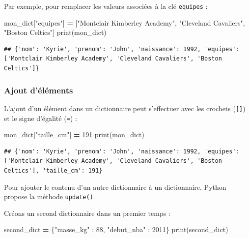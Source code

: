 \documentclass[12pt,]{book}
\newenvironment{Shaded}{\begin{snugshade}}{\end{snugshade}}
\newcommand{\DecValTok}[1]{\textcolor[rgb]{0.00,0.00,0.81}{#1}}
\newcommand{\StringTok}[1]{\textcolor[rgb]{0.31,0.60,0.02}{#1}}
\newcommand{\OperatorTok}[1]{\textcolor[rgb]{0.81,0.36,0.00}{\textbf{#1}}}
\newcommand{\BuiltInTok}[1]{#1}
\newcommand{\NormalTok}[1]{#1}
\numberwithin{equation}{section}
\numberwithin{countremarque}{section}
\begin{document}
Par exemple, pour remplacer les valeurs associées à la clé
\texttt{equipes} :

\begin{Shaded}
\begin{Highlighting}[]
\NormalTok{mon_dict[}\StringTok{"equipes"}\NormalTok{] }\OperatorTok{=}\NormalTok{ [}\StringTok{"Montclair Kimberley Academy"}\NormalTok{,}
  \StringTok{"Cleveland Cavaliers"}\NormalTok{, }\StringTok{"Boston Celtics"}\NormalTok{]}
\BuiltInTok{print}\NormalTok{(mon_dict)}
\end{Highlighting}
\end{Shaded}

\begin{lstlisting}
## {'nom': 'Kyrie', 'prenom': 'John', 'naissance': 1992, 'equipes': ['Montclair Kimberley Academy', 'Cleveland Cavaliers', 'Boston Celtics']}
\end{lstlisting}

\subsubsection{Ajout d'éléments}\label{ajout-delements-1}

L'ajout d'un élément dans un dictionnaire peut s'effectuer avec les
crochets (\texttt{{[}{]}}) et le signe d'égalité (\texttt{=}) :

\begin{Shaded}
\begin{Highlighting}[]
\NormalTok{mon_dict[}\StringTok{"taille_cm"}\NormalTok{] }\OperatorTok{=} \DecValTok{191}
\BuiltInTok{print}\NormalTok{(mon_dict)}
\end{Highlighting}
\end{Shaded}

\begin{lstlisting}
## {'nom': 'Kyrie', 'prenom': 'John', 'naissance': 1992, 'equipes': ['Montclair Kimberley Academy', 'Cleveland Cavaliers', 'Boston Celtics'], 'taille_cm': 191}
\end{lstlisting}

Pour ajouter le contenu d'un autre dictionnaire à un dictionnaire,
Python propose la méthode \texttt{update()}.

Créons un second dictionnaire dans un premier temps :

\begin{Shaded}
\begin{Highlighting}[]
\NormalTok{second_dict }\OperatorTok{=}\NormalTok{ \{}\StringTok{"masse_kg"}\NormalTok{ : }\DecValTok{88}\NormalTok{, }\StringTok{"debut_nba"}\NormalTok{ : }\DecValTok{2011}\NormalTok{\}}
\BuiltInTok{print}\NormalTok{(second_dict)}
\end{Highlighting}
\end{Shaded}
\end{document}
